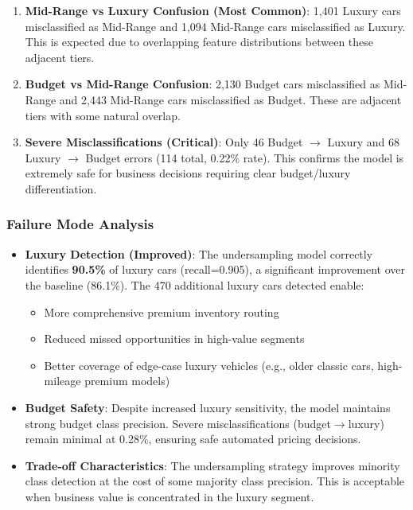 \documentclass[12pt, a4paper]{article}
\begin{document}
\begin{enumerate}
    \item \textbf{Mid-Range vs Luxury Confusion (Most Common)}: 1,401 Luxury cars misclassified as Mid-Range and 1,094 Mid-Range cars misclassified as Luxury. This is expected due to overlapping feature distributions between these adjacent tiers.
    
    \item \textbf{Budget vs Mid-Range Confusion}: 2,130 Budget cars misclassified as Mid-Range and 2,443 Mid-Range cars misclassified as Budget. These are adjacent tiers with some natural overlap.
    
    \item \textbf{Severe Misclassifications (Critical)}: Only 46 Budget $\rightarrow$ Luxury and 68 Luxury $\rightarrow$ Budget errors (114 total, 0.22\% rate). This confirms the model is extremely safe for business decisions requiring clear budget/luxury differentiation.
\end{enumerate}

\subsubsection{Failure Mode Analysis}
\begin{itemize}
    \item \textbf{Luxury Detection (Improved)}: The undersampling model correctly identifies \textbf{90.5\%} of luxury cars (recall=0.905), a significant improvement over the baseline (86.1\%). The 470 additional luxury cars detected enable:
    \begin{itemize}
        \item More comprehensive premium inventory routing
        \item Reduced missed opportunities in high-value segments
        \item Better coverage of edge-case luxury vehicles (e.g., older classic cars, high-mileage premium models)
    \end{itemize}
    
    \item \textbf{Budget Safety}: Despite increased luxury sensitivity, the model maintains strong budget class precision. Severe misclassifications (budget$\rightarrow$luxury) remain minimal at 0.28\%, ensuring safe automated pricing decisions.
    
    \item \textbf{Trade-off Characteristics}: The undersampling strategy improves minority class detection at the cost of some majority class precision. This is acceptable when business value is concentrated in the luxury segment.
\end{itemize}
\end{document}
